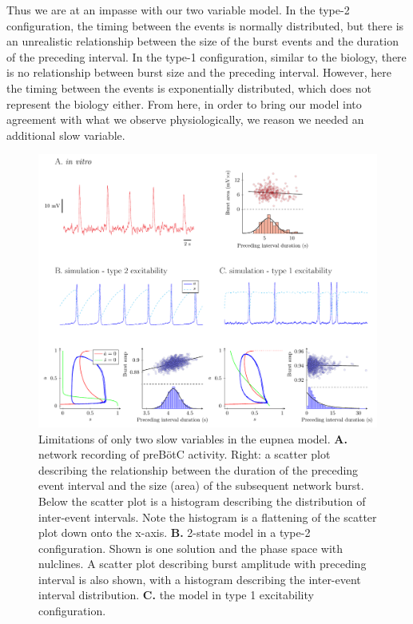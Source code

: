 \documentclass[12pt]{article}
\def\pre{preB\"otC\xspace}
\begin{document}
Thus we are at an impasse with our two variable model. In the type-2 configuration, the timing between the events is normally distributed, but there is an unrealistic relationship between the size of the burst events and the duration of the preceding interval. In the type-1 configuration, similar to the biology, there is no relationship between burst size and the preceding interval. However, here the timing between the events is exponentially distributed, which does not represent the biology either. From here, in order to bring our model into agreement with what we observe physiologically, we reason we needed an additional slow variable. 

\begin{figure}[h!]
\centering 
\includegraphics[width=\textwidth]{Fig01TabakRinzelOneVarIntro_v3.pdf}
\caption{Limitations of only two slow variables in the eupnea model. \textbf{A.} network recording of \pre activity. Right: a scatter plot describing the relationship between the duration of the preceding event interval and the size (area) of the subsequent network burst. Below the scatter plot is a histogram describing the distribution of inter-event intervals. Note the histogram is a flattening of the scatter plot down onto the x-axis. \textbf{B.} 2-state model in a type-2 configuration. Shown is one solution and the phase space with nulclines. A scatter plot describing burst amplitude with preceding interval is also shown, with a histogram describing the inter-event interval distribution. \textbf{C.} the model in type 1 excitability configuration.}
\label{TabakRinzelOneVarIntro}
\end{figure}
\end{document}
